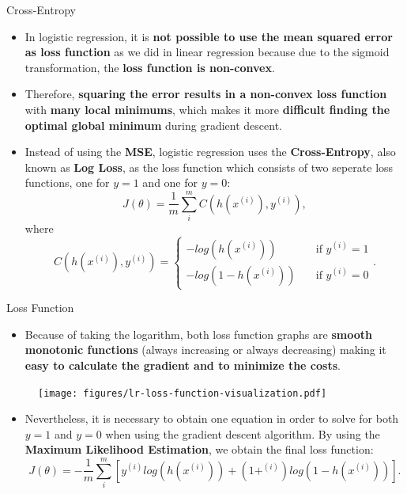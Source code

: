 \documentclass[main.tex]{subfiles}
\begin{document}
    \begin{frame}{Cross-Entropy}
        \begin{itemize}
            \item In logistic regression, it is \textbf{not possible to use the mean squared error as loss function} as we did in linear regression because due to the sigmoid transformation, the \textbf{loss function is non-convex}.
            \item Therefore, \textbf{squaring the error results in a non-convex loss function} with \textbf{many local minimums}, which makes it more \textbf{difficult finding the optimal global minimum} during gradient descent.
            \item Instead of using the \textbf{MSE}, logistic regression uses the \textbf{Cross-Entropy}, also known as \textbf{Log Loss}, as the loss function which consists of two seperate loss functions, one for $y=1$ and one for $y=0$: 
            $$J(\theta)= \frac{1}{m} \sum_{i}^{m} C(h(x^{(i)}), y^{(i)}),$$
            where
            \[ C(h(x^{(i)}), y^{(i)})  =
            \begin{cases}
            -log(h(x^{(i)}))        & \quad \text{if } y^{(i)} = 1 \\
            -log(1 - h(x^{(i)}))    & \quad \text{if } y^{(i)} = 0
            \end{cases}.
            \]
        \end{itemize}
    \end{frame}

	\begin{frame}{Loss Function}
        \begin{itemize}
            \item Because of taking the logarithm, both loss function graphs are \textbf{smooth monotonic functions} (always increasing or always decreasing) making it \textbf{easy to calculate the gradient and to minimize the costs}.
        \end{itemize}
        \begin{figure}
            \label{fig:lr-loss-function-visualization}
            \texttt{[image: figures/lr-loss-function-visualization.pdf]}
        \end{figure}
        \begin{itemize}
            \item Nevertheless, it is necessary to obtain one equation in order to solve for both $y=1$ and $y=0$ when using the gradient descent algorithm. By using the \textbf{Maximum Likelihood Estimation}, we obtain the final loss function:
            $$J(\theta)= -\frac{1}{m} \sum_{i}^{m} [y^{(i)}log(h(x^{(i)})) + 
            (1+^{(i)})log(1 - h(x^{(i)}))].$$
        \end{itemize}
    \end{frame}
\end{document}

